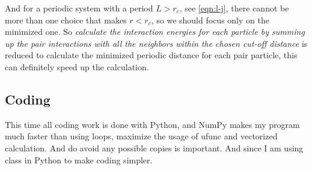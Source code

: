 \documentclass[UTF8,a4paper]{article}
\begin{document}
\begin{enumerate}
	      And for a periodic system with a period $L > r_c$, see \eqref{eqn:l-j}, there cannot be more than one choice that makes $r < r_c$, so we should focus only on the minimized one. So
	      \textit{calculate the interaction energies for each particle by summing up the pair interactions with all the neighbors within the chosen cut-off distance} is reduced to calculate the minimized periodic
	      distance for each pair particle, this can definitely speed up the calculation.
\end{enumerate}
\subsection{Coding}
This time all coding work is done with Python, and NumPy makes my program much faster than using loops, maximize the usage of ufunc and vectorized calculation. And do avoid any possible copies is important.
And since I am using class in Python to make coding simpler.
\end{document}
